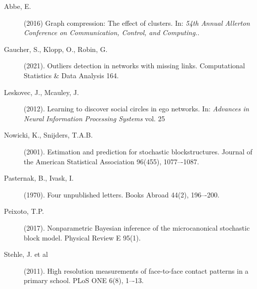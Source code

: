 
\begin{description}

	\item[Abbe, E.] (2016) Graph compression: The effect of clusters.
	In: {\it 54th Annual Allerton Conference on Communication, Control, and Computing.}.
	

	\item[Gaucher, S., Klopp, O., Robin, G.] (2021).
	Outliers detection in networks with missing links.
	Computational Statistics \& Data Analysis 164.

	\item[Leskovec, J., Mcauley, J.] (2012).
	Learning to discover social circles in ego networks.
	In: {\it Advances in Neural Information Processing Systems} vol. 25

	\item[Nowicki, K., Snijders, T.A.B.] (2001).
	Estimation and prediction for stochastic blockstructures. 
	Journal of the American Statistical Association 96(455), 1077–-1087.

	\item[Pasternak, B., Ivask, I.] (1970).
	Four unpublished letters. Books Abroad 44(2), 196–-200.

	

	\item[Peixoto, T.P.] (2017).
	Nonparametric Bayesian inference of the microcanonical
	stochastic block model. Physical Review E 95(1).


	\item[Stehle, J. et al] (2011).
	High resolution measurements of face-to-face contact patterns in a primary school.
	PLoS ONE 6(8), 1–-13.

\end{description}